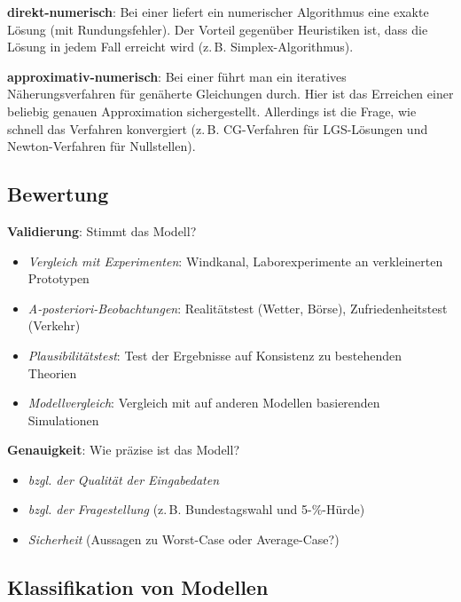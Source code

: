 \textbf{direkt-numerisch}:
Bei einer  liefert ein numerischer Algorithmus eine exakte
Lösung (mit Rundungsfehler).
Der Vorteil gegenüber Heuristiken ist, dass die Lösung in jedem Fall erreicht wird
(z.\,B. Simplex-Algorithmus).

\textbf{approximativ-numerisch}:
Bei einer  führt man ein iteratives Näherungsverfahren
für genäherte Gleichungen durch.
Hier ist das Erreichen einer beliebig genauen Approximation sichergestellt.
Allerdings ist die Frage, wie schnell das Verfahren konvergiert
(z.\,B. CG-Verfahren für LGS-Lösungen und Newton-Verfahren für Nullstellen).

\pagebreak

\subsection{%
    Bewertung%
}

\textbf{Validierung}:
Stimmt das Modell?
\begin{itemize}
    \item
    \emph{Vergleich mit Experimenten}:
    Windkanal,
    Laborexperimente an verkleinerten Prototypen
    
    \item
    \emph{A-posteriori-Beobachtungen}:
    Realitätstest (Wetter, Börse),
    Zufriedenheitstest (Verkehr)
    
    \item
    \emph{Plausibilitätstest}:
    Test der Ergebnisse auf Konsistenz zu bestehenden Theorien
    
    \item
    \emph{Modellvergleich}:
    Vergleich mit auf anderen Modellen basierenden Simulationen
\end{itemize}

\textbf{Genauigkeit}:
Wie präzise ist das Modell?
\begin{itemize}
    \item
    \emph{bzgl. der Qualität der Eingabedaten}
    
    \item
    \emph{bzgl. der Fragestellung}
    (z.\,B. Bundestagswahl und 5-\%-Hürde)
    
    \item
    \emph{Sicherheit}
    (Aussagen zu Worst-Case oder Average-Case?)
\end{itemize}

\subsection{%
    Klassifikation von Modellen%
}

